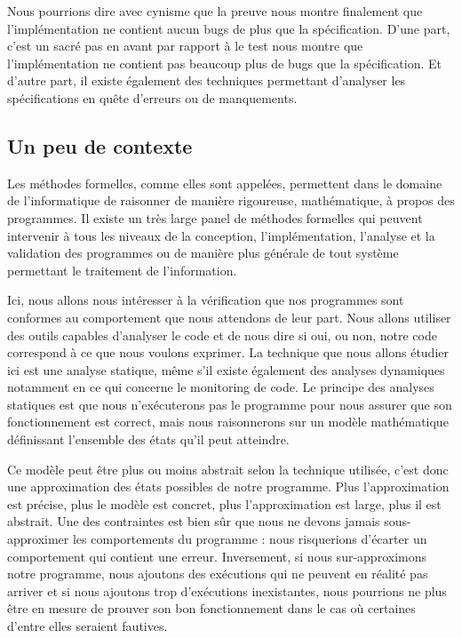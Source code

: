 \documentclass[12pt,francais,]{scrbook}
\begin{document}
Nous pourrions dire avec cynisme que la preuve nous montre finalement
que l'implémentation \og{}ne contient aucun bugs de plus que la
spécification\fg{}. D'une part, c'est un sacré pas en avant par rapport à
\og{}le test nous montre que l'implémentation ne contient pas beaucoup plus
de bugs que la spécification\fg{}. Et d'autre part, il existe également des
techniques permettant d'analyser les spécifications en quête d'erreurs
ou de manquements.

\subsection{Un peu de contexte}\label{un-peu-de-contexte}

Les méthodes formelles, comme elles sont appelées, permettent dans le
domaine de l'informatique de raisonner de manière rigoureuse,
mathématique, à propos des programmes. Il existe un très large panel de
méthodes formelles qui peuvent intervenir à tous les niveaux de la
conception, l'implémentation, l'analyse et la validation des programmes
ou de manière plus générale de tout système permettant le traitement de
l'information.

Ici, nous allons nous intéresser à la vérification que nos programmes
sont conformes au comportement que nous attendons de leur part. Nous
allons utiliser des outils capables d'analyser le code et de nous dire
si oui, ou non, notre code correspond à ce que nous voulons exprimer. La
technique que nous allons étudier ici est une analyse statique, même
s'il existe également des analyses dynamiques notamment en ce qui
concerne le monitoring de code. Le principe des analyses statiques est
que nous n'exécuterons pas le programme pour nous assurer que son
fonctionnement est correct, mais nous raisonnerons sur un modèle
mathématique définissant l'ensemble des états qu'il peut atteindre.

Ce modèle peut être plus ou moins abstrait selon la technique utilisée,
c'est donc une approximation des états possibles de notre programme.
Plus l'approximation est précise, plus le modèle est concret, plus
l'approximation est large, plus il est abstrait. Une des contraintes est
bien sûr que nous ne devons jamais sous-approximer les comportements du
programme : nous risquerions d'écarter un comportement qui contient une
erreur. Inversement, si nous sur-approximons notre programme, nous
ajoutons des exécutions qui ne peuvent en réalité pas arriver et si nous
ajoutons trop d'exécutions inexistantes, nous pourrions ne plus être en
mesure de prouver son bon fonctionnement dans le cas où certaines
d'entre elles seraient fautives.
\end{document}
